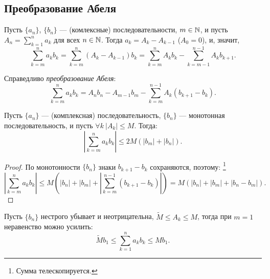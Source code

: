
\subsection{Преобразование Абеля}
\begin{definition}
    Пусть $\{a_n\}$, $\{b_n\}$ --- (комлексные) последовательности, $m \in \mathbb{N}$, и пусть $A_n = \sum_{k=1}^n a_k$ для всех $n \in \mathbb{N}$. Тогда $a_k = A_k - A_{k-1}$ ($A_0 = 0$), и, значит,
    \[
        \sum_{k=m}^{n} a_k b_k = \sum_{k=m}^n (A_k - A_{k - 1})b_k = \sum_{k=m}^n A_k b_k - \sum_{k = m - 1}^{n - 1} A_k b_{k + 1}.
    \]

    Справедливо \emph{преобразование Абеля}:
    \[
        \sum_{k=m}^n a_k b_k = A_n b_n - A_{m - 1} b_m - \sum_{k = m}^{n - 1} A_k (b_{k + 1} - b_k).
    \]
\end{definition}

\begin{lemma}[Абель]
    Пусть $\{a_n\}$ --- (комплексная) последовательность, $\{b_n\}$ --- монотонная последовательность, и пусть $\forall k \ |A_k| \le M$. Тогда:
    \[
        \left|\sum_{k=m}^n a_k b_k \right| \le 2M(|b_m| + |b_n|).
    \]

    \begin{proof}
        По монотонности $\{b_n\}$ знаки $b_{k + 1} - b_k$ сохраняются, поэтому:
        \footnote{Сумма телескопируется.}
        \[
            \left| \sum_{k=m}^n a_k b_k \right| \le M \left(|b_n| + |b_m| + \left| \sum_{k = m}^{n - 1} (b_{k+1} - b_k) \right| \right) = M \left(|b_n| + |b_m| + |b_n - b_m| \right).
        \]
    \end{proof}
\end{lemma}

\begin{note}
    Пусть $\{b_n\}$ нестрого убывает и неотрицательна, $\widetilde{M} \le A_k \le M$, тогда при $m = 1$ неравенство можно усилить:
    \[
        \widetilde{M} b_1 \le \sum_{k=1}^n a_k b_k \le M b_1.
    \]
\end{note}

